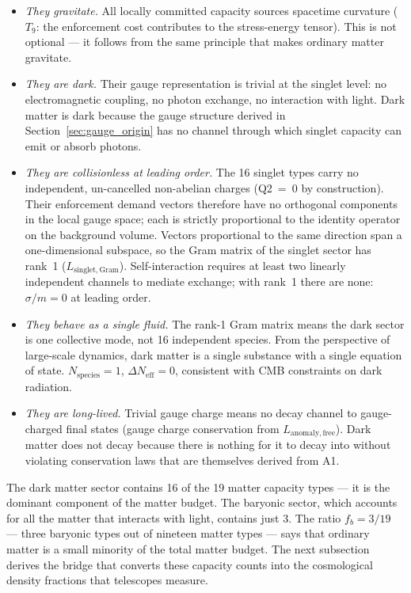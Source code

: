 \documentclass[11pt]{article}
\newenvironment{varlist}{\begin{itemize}[nosep,leftmargin=2em]}{\end{itemize}}
\begin{document}
\begin{varlist}
\item \textit{They gravitate.}  All locally committed capacity sources spacetime curvature ($T_9$: the enforcement cost contributes to the stress-energy tensor).  This is not optional --- it follows from the same principle that makes ordinary matter gravitate.
\item \textit{They are dark.}  Their gauge representation is trivial at the singlet level: no electromagnetic coupling, no photon exchange, no interaction with light.  Dark matter is dark because the gauge structure derived in Section~\ref{sec:gauge_origin} has no channel through which singlet capacity can emit or absorb photons.
\item \textit{They are collisionless at leading order.}  The 16 singlet types carry no independent, un-cancelled non-abelian charges (Q2~=~0 by construction).  Their enforcement demand vectors therefore have no orthogonal components in the local gauge space; each is strictly proportional to the identity operator on the background volume.  Vectors proportional to the same direction span a one-dimensional subspace, so the Gram matrix of the singlet sector has rank~1 ($L_{\mathrm{singlet,Gram}}$).  Self-interaction requires at least two linearly independent channels to mediate exchange; with rank~1 there are none: $\sigma/m = 0$ at leading order.
\item \textit{They behave as a single fluid.}  The rank-1 Gram matrix means the dark sector is one collective mode, not 16 independent species.  From the perspective of large-scale dynamics, dark matter is a single substance with a single equation of state.  $N_{\mathrm{species}} = 1$, $\Delta N_{\mathrm{eff}} = 0$, consistent with CMB constraints on dark radiation.
\item \textit{They are long-lived.}  Trivial gauge charge means no decay channel to gauge-charged final states (gauge charge conservation from $L_{\mathrm{anomaly,free}}$).  Dark matter does not decay because there is nothing for it to decay into without violating conservation laws that are themselves derived from A1.
\end{varlist}

The dark matter sector contains 16 of the 19 matter capacity types --- it is the dominant component of the matter budget.  The baryonic sector, which accounts for all the matter that interacts with light, contains just 3.  The ratio $f_b = 3/19$ --- three baryonic types out of nineteen matter types --- says that ordinary matter is a small minority of the total matter budget.  The next subsection derives the bridge that converts these capacity counts into the cosmological density fractions that telescopes measure.
\end{document}
